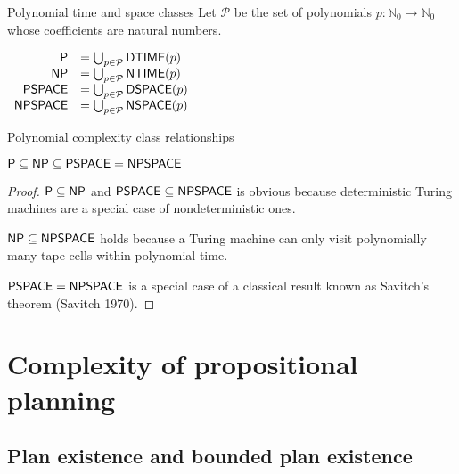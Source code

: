 \documentclass{gkibeamer}
\begin{document}
\begin{frame}{Polynomial time and space classes}
  Let $\mathcal P$ be the set of polynomials $p: \mathbb N_0 \to
  \mathbb N_0$ whose coefficients are natural numbers.
  \begin{definition}[\ptime, \np, \pspace, \npspace]
    \renewcommand{\arraycolsep}{1pt}
    $\begin{array}{rl}
      \textsf{\textup{P}} & = \bigcup_{p \in \mathcal P} \textsf{\textup{DTIME}}(p) \\
      \textsf{\textup{NP}} & = \bigcup_{p \in \mathcal P} \textsf{\textup{NTIME}}(p) \\
      \textsf{\textup{PSPACE}} & = \bigcup_{p \in \mathcal P} \textsf{\textup{DSPACE}}(p) \\
      \textsf{\textup{NPSPACE}} & = \bigcup_{p \in \mathcal P} \textsf{\textup{NSPACE}}(p)
    \end{array}$
  \end{definition}
\end{frame}

\begin{frame}{Polynomial complexity class relationships}
  \begin{theorem}
    $\textsf{\textup{P}} \subseteq \textsf{\textup{NP}} \subseteq \textsf{\textup{PSPACE}} = \textsf{\textup{NPSPACE}}$
  \end{theorem}
  \begin{proof}
    $\textsf{\textup{P}} \subseteq \textsf{\textup{NP}}$ and $\textsf{\textup{PSPACE}} \subseteq \textsf{\textup{NPSPACE}}$ is
    obvious because deterministic Turing machines are a special case
    of nondeterministic ones.

    \smallskip

    $\textsf{\textup{NP}} \subseteq \textsf{\textup{NPSPACE}}$ holds because a Turing machine can
    only visit polynomially many tape cells within polynomial time.

    \smallskip

    $\textsf{\textup{PSPACE}} = \textsf{\textup{NPSPACE}}$ is a special case of a classical result known
    as Savitch's theorem (Savitch 1970).
  \end{proof}
\end{frame}

\section[Complexity of planning]{Complexity of propositional planning}
\subsection[(Bounded) plan existence]{Plan existence and bounded plan existence}
\end{document}
